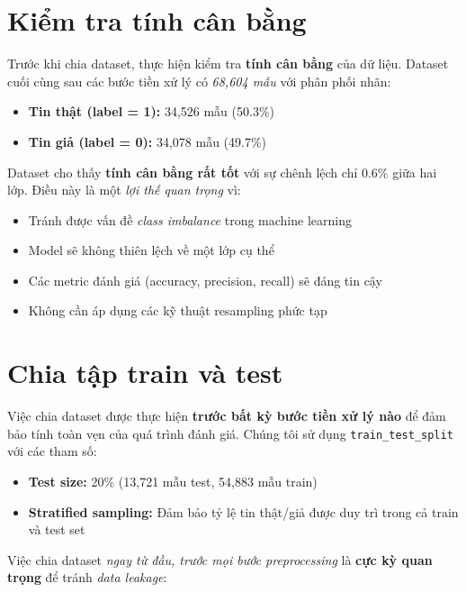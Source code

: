\section{Kiểm tra tính cân bằng}

Trước khi chia dataset, thực hiện kiểm tra \textbf{tính cân bằng} của dữ liệu. Dataset cuối cùng sau các bước tiền xử lý có \textit{68,604 mẫu} với phân phối nhãn:

\begin{itemize}
    \item \textbf{Tin thật (label = 1):} 34,526 mẫu (50.3\%)
    \item \textbf{Tin giả (label = 0):} 34,078 mẫu (49.7\%)
\end{itemize}

\noindent Dataset cho thấy \textbf{tính cân bằng rất tốt} với sự chênh lệch chỉ 0.6\% giữa hai lớp. Điều này là một \textit{lợi thế quan trọng} vì:
\begin{itemize}
    \item Tránh được vấn đề \textit{class imbalance} trong machine learning
    \item Model sẽ không thiên lệch về một lớp cụ thể
    \item Các metric đánh giá (accuracy, precision, recall) sẽ đáng tin cậy
    \item Không cần áp dụng các kỹ thuật resampling phức tạp
\end{itemize}

\section{Chia tập train và test}

Việc chia dataset được thực hiện \textbf{trước bất kỳ bước tiền xử lý nào} để đảm bảo tính toàn vẹn của quá trình đánh giá. Chúng tôi sử dụng \texttt{train\_test\_split} với các tham số:

\begin{itemize}
    \item \textbf{Test size:} 20\% (13,721 mẫu test, 54,883 mẫu train)
    \item \textbf{Stratified sampling:} Đảm bảo tỷ lệ tin thật/giả được duy trì trong cả train và test set
\end{itemize}

\noindent Việc chia dataset \textit{ngay từ đầu, trước mọi bước preprocessing} là \textbf{cực kỳ quan trọng} để tránh \textit{data leakage}:

